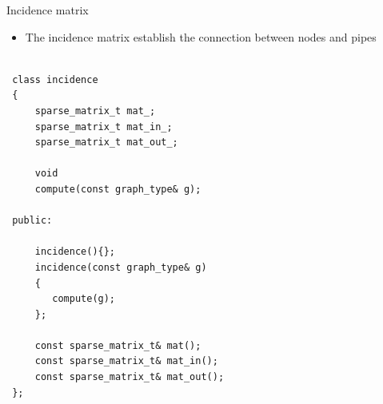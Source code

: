 \begin{frame}[fragile]{Incidence matrix}

\begin{itemize}
    \setlength{\itemindent}{-1.5em}
    \item The incidence matrix establish the connection between nodes and pipes
\end{itemize}

\begin{minipage}{0.35\textwidth}
\begin{verbatim}

 class incidence
 {
     sparse_matrix_t mat_;
     sparse_matrix_t mat_in_;
     sparse_matrix_t mat_out_; 
    
     void 
     compute(const graph_type& g);
    
 public:

     incidence(){};
     incidence(const graph_type& g)    
     { 
        compute(g);
     };
    
     const sparse_matrix_t& mat();     
     const sparse_matrix_t& mat_in();   
     const sparse_matrix_t& mat_out();   
 };
 
\end{verbatim}
\end{minipage}%
\hfill
\hspace{0.2 cm}
\begin{minipage}{0.55\textwidth}


\end{minipage}
\end{frame}
